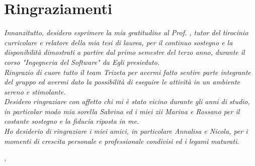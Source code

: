 \cleardoublepage
{}
{}


\bigskip

\begingroup
\let\clearpage\relax
\let\cleardoublepage\relax
\let\cleardoublepage\relax

\chapter*{Ringraziamenti}

\noindent \textit{Innanzitutto, desidero esprimere la mia gratitudine al Prof. \myProf, tutor del tirocinio curricolare e relatore della mia tesi di laurea, per il continuo sostegno e la disponibilità dimostrati a partire dal primo semestre del terzo anno, durante il corso "Ingegneria del Software" da Egli presieduto.}\\

\noindent \textit{Ringrazio di cuore tutto il team Trizeta per avermi fatto sentire parte integrante del gruppo ed avermi dato la possibilità di eseguire le attività in un ambiente sereno e stimolante.}\\

\noindent \textit{Desidero ringraziare con affetto chi mi è stato vicino durante gli anni di studio, in particolar modo mia sorella Sabrina ed i miei zii Marina e Rossano per il costante sostegno e la fiducia riposta in me.}\\

\noindent \textit{Ho desiderio di ringraziare i miei amici, in particolare Annalisa e Nicola, per i momenti di crescita personale e professionale condivisi ed i legami maturati.}\\
\bigskip

\noindent\textit{\myLocation, \myTime}
\hfill \myName

\endgroup
